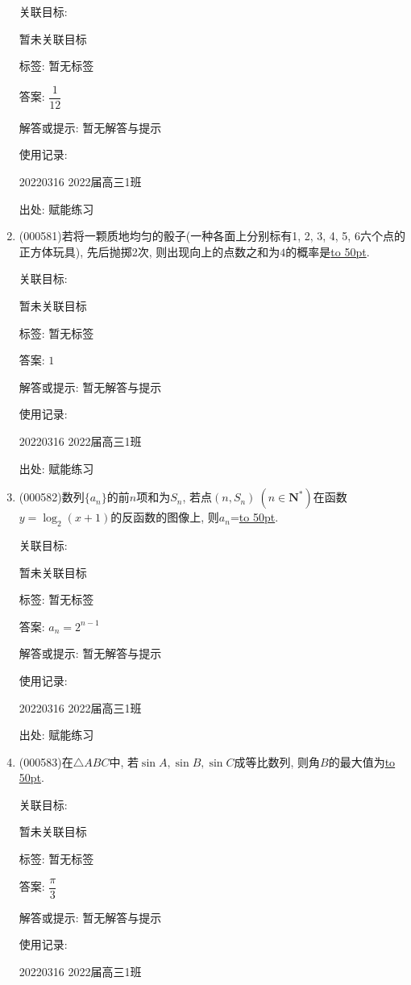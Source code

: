 \documentclass[10pt,a4paper]{article}
\newcommand{\blank}[1]{\underline{\hbox to #1pt{}}}
\begin{document}
\begin{enumerate}[1.]
关联目标:

暂未关联目标



标签: 暂无标签

答案: $\dfrac 1{12}$

解答或提示: 暂无解答与提示

使用记录:

20220316	2022届高三1班	


出处: 赋能练习
\item { (000581)}若将一颗质地均匀的骰子(一种各面上分别标有1, 2, 3, 4, 5, 6六个点的正方体玩具), 先后抛掷2次, 则出现向上的点数之和为$4$的概率是\blank{50}.


关联目标:

暂未关联目标



标签: 暂无标签

答案: $1$

解答或提示: 暂无解答与提示

使用记录:

20220316	2022届高三1班	


出处: 赋能练习
\item { (000582)}数列$\{a_n\}$的前$n$项和为$S_n$, 若点$(n,S_n) \ (n\in \mathbf{N}^*)$在函数$y=\log_2 (x+1)$的反函数的图像上, 则$a_n$=\blank{50}.


关联目标:

暂未关联目标



标签: 暂无标签

答案: $a_n=2^{n-1}$

解答或提示: 暂无解答与提示

使用记录:

20220316	2022届高三1班	


出处: 赋能练习
\item { (000583)}在$\triangle ABC$中, 若$\sin A,\sin B,\sin C$成等比数列, 则角$B$的最大值为\blank{50}.


关联目标:

暂未关联目标



标签: 暂无标签

答案: $\dfrac{\pi }3$

解答或提示: 暂无解答与提示

使用记录:

20220316	2022届高三1班	



\end{enumerate}
\end{document}
